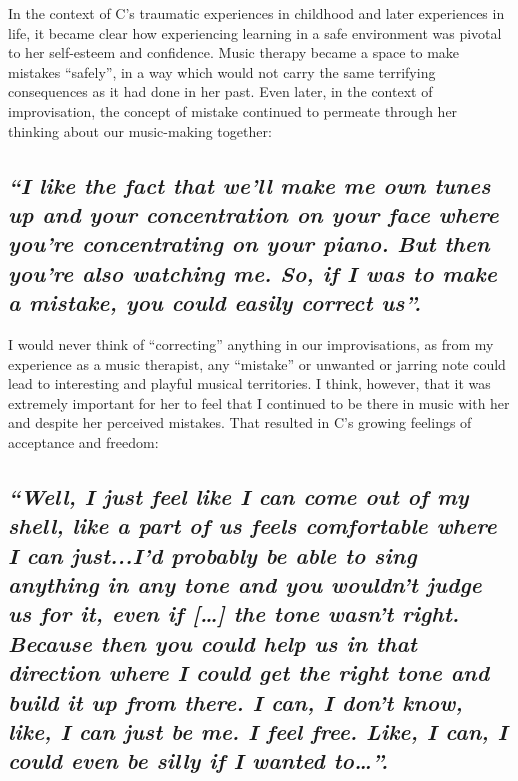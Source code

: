 \documentclass[authordate, empirical]{jote-new-article}
\begin{document}
In the context of C's traumatic experiences in childhood and later experiences in life, it became clear how experiencing learning in a safe environment was pivotal to her self-esteem and confidence. Music therapy became a space to make mistakes “safely”, in a way which would not carry the same terrifying consequences as it had done in her past. Even later, in the context of improvisation, the concept of mistake continued to permeate through her thinking about our music-making together:







\subsection{\emph{“I like the fact that we'll make me own tunes up and your concentration on your face where you're concentrating on your piano. But then you're also watching me. So, if I was to make a mistake, you could easily correct us”.}}







I would never think of “correcting” anything in our improvisations, as from my experience as a music therapist, any “mistake” or unwanted or jarring note could lead to interesting and playful musical territories. I think, however, that it was extremely important for her to feel that I continued to be there in music with her\emph{ }and despite\emph{ }her perceived mistakes. That resulted in C's growing feelings of acceptance and freedom:\emph{ }







\subsection{\emph{“Well, I just feel like I can come out of my shell, like a part of us feels comfortable where I can just...I'd probably be able to sing anything in any tone and you wouldn't judge us for it, even if […] the tone wasn't right. Because then you could help us in that direction where I could get the right tone and build it up from there. I can, I don't know, like, I can just be me. I feel free. Like, I can, I could even be silly if I wanted to…”. }}
\end{document}
